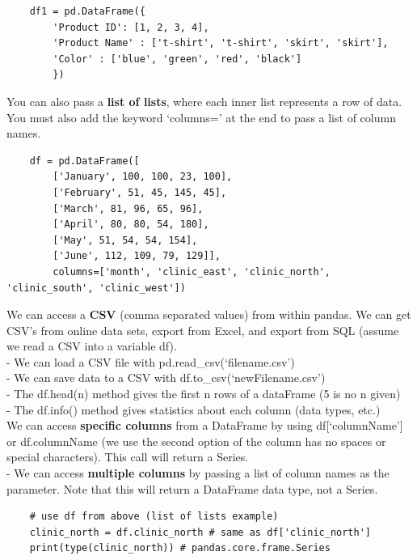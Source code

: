\documentclass[11pt, a4paper]{article}
\begin{document}
\begin{spacing}{1.1}
\begin{lstlisting}
	df1 = pd.DataFrame({
		'Product ID': [1, 2, 3, 4],
		'Product Name' : ['t-shirt', 't-shirt', 'skirt', 'skirt'],
		'Color' : ['blue', 'green', 'red', 'black']
		}) \end{lstlisting}\vspace*{1mm}
	You can also pass a \textbf{list of lists}, where each inner list represents a row of data. You must also add the keyword `columns=' at the end to pass a list of column names.
	\begin{lstlisting}
	df = pd.DataFrame([
		['January', 100, 100, 23, 100],
		['February', 51, 45, 145, 45],
		['March', 81, 96, 65, 96],
		['April', 80, 80, 54, 180],
		['May', 51, 54, 54, 154],
		['June', 112, 109, 79, 129]],
		columns=['month', 'clinic_east', 'clinic_north', 'clinic_south', 'clinic_west']) \end{lstlisting}\vspace*{1mm}
	We can access a \textbf{CSV} (comma separated values) from within pandas. We can get CSV's from online data sets, export from Excel, and export from SQL (assume we read a CSV into a variable df). \\
	\hspace*{4mm} - We can load a CSV file with pd.read\_csv(`filename.csv') \\
	\hspace*{4mm} - We can save data to a CSV with df.to\_csv(`newFilename.csv') \\
	\hspace*{4mm} - The df.head(n) method gives the first n rows of a dataFrame (5 is no n given) \\
	\hspace*{4mm} - The df.info() method gives statistics about each column (data types, etc.) \vspace*{1.5mm} \\
	\noindent We can access \textbf{specific columns} from a DataFrame by using df[`columnName'] or df.columnName (we use the second option of the column has no spaces or special characters). This call will return a Series. \\
	\hspace*{4mm} - We can access \textbf{multiple columns} by passing a list of column names as the parameter. Note that \hspace*{7mm} this will return a DataFrame data type, not a Series.
	\begin{lstlisting}
	# use df from above (list of lists example)
	clinic_north = df.clinic_north # same as df['clinic_north']
	print(type(clinic_north)) # pandas.core.frame.Series
	

\end{lstlisting}
\end{spacing}
\end{document}
